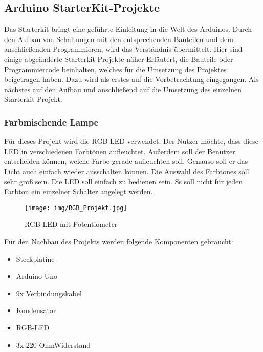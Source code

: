

\subsection{Arduino StarterKit-Projekte}

Das Starterkit bringt eine geführte Einleitung in die Welt des Arduinos. Durch den Aufbau von Schaltungen mit den entsprechenden Bauteilen und dem anschließenden Programmieren, wird das Verständnis übermittelt.
Hier sind einige abgeänderte Starterkit-Projekte näher Erläutert, die Bauteile oder Programmiercode beinhalten, welches für die Umsetzung des  Projektes beigetragen haben. Dazu wird als erstes auf die Vorbetrachtung eingegangen. Als nächstes auf den Aufbau und anschließend auf die Umsetzung des einzelnen Starterkit-Projekt.


\subsubsection{Farbmischende Lampe}

Für dieses Projekt wird die RGB-LED verwendet. Der Nutzer möchte, dass diese LED in verschiedenen Farbtönen aufleuchtet. Außerdem soll der Benutzer entscheiden können, welche Farbe gerade aufleuchten soll. Genauso soll er das Licht auch einfach wieder ausschalten können. Die Auswahl des Farbtones soll sehr groß sein. Die LED soll einfach zu bedienen sein. Ss soll nicht für jeden Farbton ein einzelner Schalter angelegt werden.
\\

\begin{figure}[h]
\begin{center}
\texttt{[image: img/RGB\_Projekt.jpg]}
\caption{RGB-LED mit Potentiometer}
\label{rgb_project}
\end{center}
\end{figure}

Für den Nachbau des Projekts werden folgende Komponenten gebraucht:
\begin{itemize}
\item{Steckplatine}
\item{Arduino Uno}
\item{9x Verbindungskabel}
\item{Kondensator}
\item{RGB-LED}
\item{3x 220-OhmWiderstand}
\end{itemize}

